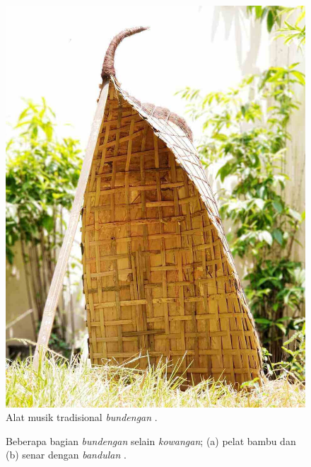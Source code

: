\begin{figure}[t!]
    \centering
    \includegraphics[width=7 cm]{Gambar/bundengan_full.jpg}
    \caption{Alat musik tradisional \textit{bundengan} \cite{fotoBuAri}.}
    \label{fig:bundengan}
\end{figure}
\begin{figure}[h!]
    \centering
    \hspace{1cm}
    \caption{Beberapa bagian \textit{bundengan} selain \textit{kowangan}; (a) pelat bambu dan (b) senar dengan \textit{bandulan} \cite{palmer}.}
\end{figure}
